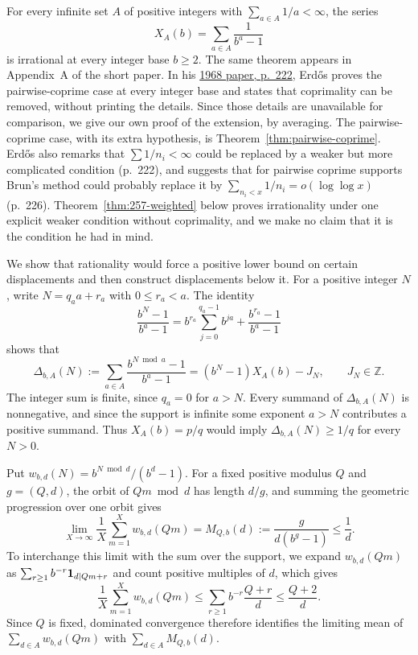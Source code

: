 \documentclass[11pt]{article}
\theoremstyle{plain}
\theoremstyle{definition}
\theoremstyle{remark}
\begin{document}
For every infinite set $A$ of positive integers with
$\sum_{a\in A}1/a<\infty$, the series
\[
 X_A(b)=\sum_{a\in A}\frac1{b^a-1}
\]
is irrational at every integer base $b\ge2$. The same theorem appears
in Appendix~A of the short paper. In his
\href{https://users.renyi.hu/~p_erdos/1969-09.pdf}{1968 paper, p.~222},
Erd\H{o}s proves the pairwise-coprime case at every integer base and
states that coprimality can be removed, without printing the details.
Since those details are unavailable for comparison, we give our own
proof of the extension, by averaging. The pairwise-coprime case, with
its extra hypothesis, is Theorem~\ref{thm:pairwise-coprime}. Erd\H{o}s
also remarks that $\sum1/n_i<\infty$ could be replaced by a weaker but more
complicated condition (p.~222), and suggests that for pairwise coprime
supports Brun's method could probably replace it by
$\sum_{n_i<x}1/n_i=o(\log\log x)$ (p.~226).
Theorem~\ref{thm:257-weighted} below proves irrationality under one explicit
weaker condition without coprimality, and we make no claim that it is the
condition he had in mind.

We show that rationality would force a positive lower bound on certain
displacements and then construct displacements below it. For a positive
integer $N$, write $N=q_a a+r_a$ with $0\le r_a<a$. The identity
\[
 \frac{b^N-1}{b^a-1}
 =b^{r_a}\sum_{j=0}^{q_a-1}b^{ja}
  +\frac{b^{r_a}-1}{b^a-1}
\]
shows that
\[
 \Delta_{b,A}(N):=\sum_{a\in A}\frac{b^{N\bmod a}-1}{b^a-1}
 =(b^N-1)X_A(b)-J_N,\qquad J_N\in\mathbb Z.
\]
The integer sum is finite, since $q_a=0$ for $a>N$. Every summand of
$\Delta_{b,A}(N)$ is nonnegative, and since the support is infinite some
exponent $a>N$ contributes a positive summand.
Thus $X_A(b)=p/q$ would imply $\Delta_{b,A}(N)\ge1/q$ for every $N>0$.

Put $w_{b,d}(N)=b^{N\bmod d}/(b^d-1)$. For a fixed positive modulus $Q$
and $g=(Q,d)$, the orbit of $Qm\bmod d$ has length $d/g$, and summing the
geometric progression over one orbit gives
\[
 \lim_{X\to\infty}\frac1X\sum_{m=1}^Xw_{b,d}(Qm)
 =M_{Q,b}(d):=\frac{g}{d(b^g-1)}\le\frac1d.
\]
To interchange this limit with the sum over the support, we expand
$w_{b,d}(Qm)$ as $\sum_{r\ge1}b^{-r}{\bf1}_{d\mid Qm+r}$ and count
positive multiples of $d$, which gives
\[
 \frac1X\sum_{m=1}^Xw_{b,d}(Qm)
 \le\sum_{r\ge1}b^{-r}\frac{Q+r}{d}
 \le\frac{Q+2}{d}.
\]
Since $Q$ is fixed, dominated convergence therefore identifies the limiting mean of $\sum_{d\in A}w_{b,d}(Qm)$ with $\sum_{d\in A}M_{Q,b}(d)$.
\end{document}
